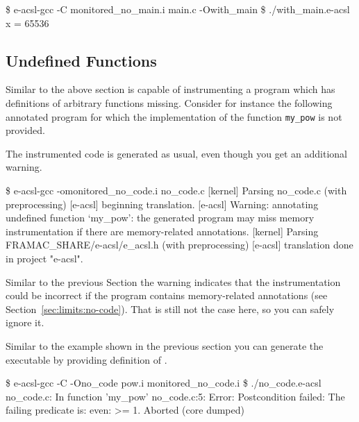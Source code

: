 
\begin{logs}
\$ e-acsl-gcc -C monitored_no_main.i main.c -Owith_main
\$ ./with_main.e-acsl
x = 65536
\end{logs}


\subsection{Undefined Functions}
\label{sec:no-code}

Similar to the above section \eacsl is capable of instrumenting a program which
has definitions of arbitrary functions missing.  Consider for instance the
following annotated program for which the implementation of the function
\texttt{my\_pow} is not provided.


The instrumented code is generated as usual, even though you get an additional
warning.
\begin{logs}
\$ e-acsl-gcc -omonitored_no_code.i no_code.c
[kernel] Parsing no_code.c (with preprocessing)
[e-acsl] beginning translation.
[e-acsl] Warning: annotating undefined function `my_pow':
  the generated program may miss memory instrumentation
  if there are memory-related annotations.
[kernel] Parsing FRAMAC_SHARE/e-acsl/e_acsl.h (with preprocessing)
[e-acsl] translation done in project "e-acsl".
\end{logs}

Similar to the previous Section the warning indicates that the instrumentation
could be incorrect if the program contains memory-related annotations (see
Section~\ref{sec:limits:no-code}). That is still not the case here, so you can
safely ignore it.


Similar to the example shown in the previous section you can generate the
executable by providing definition of .

\begin{logs}
\$ e-acsl-gcc -C -Ono_code pow.i monitored_no_code.i
\$ ./no_code.e-acsl
no_code.c: In function 'my_pow'
no_code.c:5: Error: Postcondition failed:
        The failing predicate is:
        even: \result >= 1.
Aborted (core dumped)
\end{logs}

